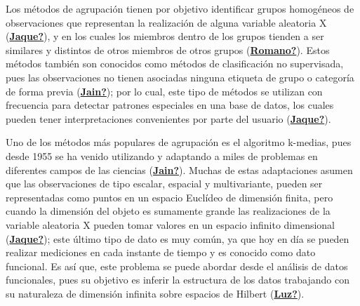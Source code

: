 \documentclass[
]{book}
\begin{document}
Los métodos de agrupación tienen por objetivo identificar grupos homogéneos de observaciones que representan la realización de alguna variable aleatoria X (\protect\hyperlink{ref-Jaque}{\textbf{Jaque?}}), y en los cuales los miembros dentro de los grupos tienden a ser similares y distintos de otros miembros de otros grupos (\protect\hyperlink{ref-Romano}{\textbf{Romano?}}). Estos métodos también son conocidos como métodos de clasificación no supervisada, pues las observaciones no tienen asociadas ninguna etiqueta de grupo o categoría de forma previa (\protect\hyperlink{ref-Jain}{\textbf{Jain?}}); por lo cual, este tipo de métodos se utilizan con frecuencia para detectar patrones especiales en una base de datos, los cuales pueden tener interpretaciones convenientes por parte del usuario (\protect\hyperlink{ref-Jaque}{\textbf{Jaque?}}).

Uno de los métodos más populares de agrupación es el algoritmo k-medias, pues desde 1955 se ha venido utilizando y adaptando a miles de problemas en diferentes campos de las ciencias (\protect\hyperlink{ref-Jain}{\textbf{Jain?}}). Muchas de estas adaptaciones asumen que las observaciones de tipo escalar, espacial y multivariante, pueden ser representadas como puntos en un espacio Euclídeo de dimensión finita, pero cuando la dimensión del objeto es sumamente grande las realizaciones de la variable aleatoria X pueden tomar valores en un espacio infinito dimensional (\protect\hyperlink{ref-Jaque}{\textbf{Jaque?}}); este último tipo de dato es muy común, ya que hoy en día se pueden realizar mediciones en cada instante de tiempo y es conocido como dato funcional. Es así que, este problema se puede abordar desde el análisis de datos funcionales, pues su objetivo es inferir la estructura de los datos trabajando con su naturaleza de dimensión infinita sobre espacios de Hilbert (\protect\hyperlink{ref-Luz}{\textbf{Luz?}}).
\end{document}
